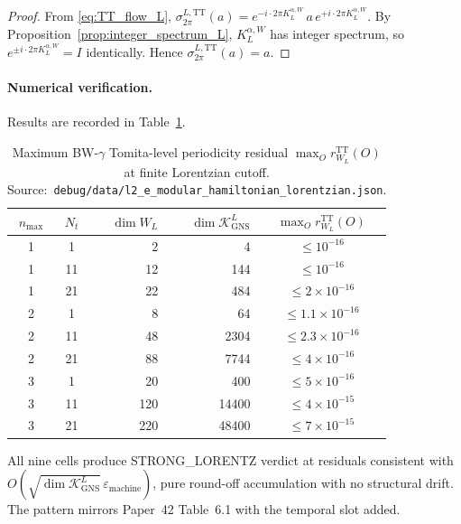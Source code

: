 \documentclass[11pt,a4paper]{article}
\theoremstyle{plain}
\theoremstyle{definition}
\newcommand{\nmax}{n_{\max}}
\newcommand{\Nt}{N_t}
\newcommand{\Krein}{\mathcal{K}}
\newcommand{\KL}{K_{L}}
\newcommand{\TT}{\mathrm{TT}}
\newcommand{\GNS}{\mathrm{GNS}}
\begin{document}
\begin{proof}
From \eqref{eq:TT_flow_L}, $\sigma_{2\pi}^{L, \TT}(a) = e^{-i \cdot 2\pi
\KL^{\alpha, W}}\, a\, e^{+i \cdot 2\pi \KL^{\alpha, W}}$. By
Proposition~\ref{prop:integer_spectrum_L}, $\KL^{\alpha, W}$ has
integer spectrum, so $e^{\pm i \cdot 2\pi \KL^{\alpha, W}} = I$
identically. Hence $\sigma_{2\pi}^{L, \TT}(a) = a$.
\end{proof}

\paragraph{Numerical verification.}
Results are recorded in Table~\ref{tab:bw_gamma_lorentz_residuals}.

\begin{table}[ht]
\centering
\caption{Maximum BW-$\gamma$ Tomita-level periodicity residual
$\max_O r_{W_L}^\TT(O)$ at finite Lorentzian cutoff. Source:\
\texttt{debug/data/l2\_e\_modular\_hamiltonian\_lorentzian.json}.}
\label{tab:bw_gamma_lorentz_residuals}
\begin{tabular}{ccrrc}
\toprule
$\nmax$ & $\Nt$ & $\dim W_L$ & $\dim \Krein_{\GNS}^L$ &
$\max_O r_{W_L}^\TT(O)$\\
\midrule
1 & 1  & 2   & 4     & $\le 10^{-16}$ \\
1 & 11 & 12  & 144   & $\le 10^{-16}$ \\
1 & 21 & 22  & 484   & $\le 2 \times 10^{-16}$ \\
2 & 1  & 8   & 64    & $\le 1.1 \times 10^{-16}$ \\
2 & 11 & 48  & 2304  & $\le 2.3 \times 10^{-16}$ \\
2 & 21 & 88  & 7744  & $\le 4 \times 10^{-16}$ \\
3 & 1  & 20  & 400   & $\le 5 \times 10^{-16}$ \\
3 & 11 & 120 & 14400 & $\le 4 \times 10^{-15}$ \\
3 & 21 & 220 & 48400 & $\le 7 \times 10^{-15}$ \\
\bottomrule
\end{tabular}
\end{table}

All nine cells produce STRONG\_LORENTZ verdict at residuals consistent
with $O(\sqrt{\dim \Krein_{\GNS}^L}\, \varepsilon_{\mathrm{machine}})$,
pure round-off accumulation with no structural drift. The pattern
mirrors Paper~42 Table~6.1 with the temporal slot added.

\end{document}
